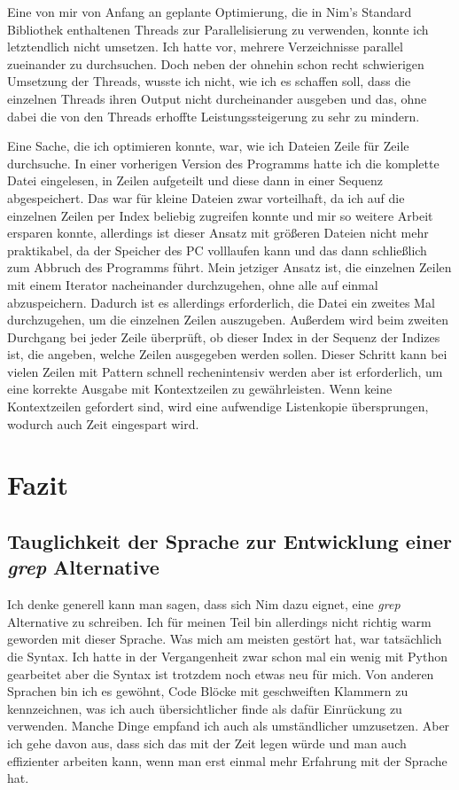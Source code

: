 \documentclass[11pt]{report}
\begin{document}
Eine von mir von Anfang an geplante Optimierung, die in Nim's Standard Bibliothek enthaltenen Threads zur Parallelisierung zu verwenden, konnte ich letztendlich nicht umsetzen. Ich hatte vor, mehrere Verzeichnisse parallel zueinander zu durchsuchen. Doch neben der ohnehin schon recht schwierigen Umsetzung der Threads, wusste ich nicht, wie ich es schaffen soll, dass die einzelnen Threads ihren Output nicht durcheinander ausgeben und das, ohne dabei die von den Threads erhoffte Leistungssteigerung zu sehr zu mindern.

Eine Sache, die ich optimieren konnte, war, wie ich Dateien Zeile für Zeile durchsuche. In einer vorherigen Version des Programms hatte ich die komplette Datei eingelesen, in Zeilen aufgeteilt und diese dann in einer Sequenz abgespeichert. Das war für kleine Dateien zwar vorteilhaft, da ich auf die einzelnen Zeilen per Index beliebig zugreifen konnte und mir so weitere Arbeit ersparen konnte, allerdings ist dieser Ansatz mit größeren Dateien nicht mehr praktikabel, da der Speicher des PC volllaufen kann und das dann schließlich zum Abbruch des Programms führt. Mein jetziger Ansatz ist, die einzelnen Zeilen mit einem Iterator nacheinander durchzugehen, ohne alle auf einmal abzuspeichern. Dadurch ist es allerdings erforderlich, die Datei ein zweites Mal durchzugehen, um die einzelnen Zeilen auszugeben. Außerdem wird beim zweiten Durchgang bei jeder Zeile überprüft, ob dieser Index in der Sequenz der Indizes ist, die angeben, welche Zeilen ausgegeben werden sollen. Dieser Schritt kann bei vielen Zeilen mit Pattern schnell rechenintensiv werden aber ist erforderlich, um eine korrekte Ausgabe mit Kontextzeilen zu gewährleisten.
Wenn keine Kontextzeilen gefordert sind, wird eine aufwendige Listenkopie übersprungen, wodurch auch Zeit eingespart wird.



\chapter{Fazit}
\section{Tauglichkeit der Sprache zur Entwicklung einer \emph{grep} Alternative}
Ich denke generell kann man sagen, dass sich Nim dazu eignet, eine \emph{grep} Alternative zu schreiben. Ich für meinen Teil bin allerdings nicht richtig warm geworden mit dieser Sprache. Was mich am meisten gestört hat, war tatsächlich die Syntax. Ich hatte in der Vergangenheit zwar schon mal ein wenig mit Python gearbeitet aber die Syntax ist trotzdem noch etwas neu für mich. Von anderen Sprachen bin ich es gewöhnt, Code Blöcke mit geschweiften Klammern zu kennzeichnen, was ich auch übersichtlicher finde als dafür Einrückung zu verwenden. Manche Dinge empfand ich auch als umständlicher umzusetzen.
\newline
Aber ich gehe davon aus, dass sich das mit der Zeit legen würde und man auch effizienter arbeiten kann, wenn man erst einmal mehr Erfahrung mit der Sprache hat.
\end{document}
